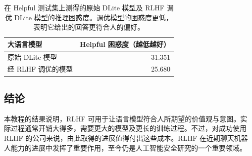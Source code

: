 \begin{table}[!htbp]
\centering
\caption{在 Helpful 测试集上测得的原始 DLite 模型及 RLHF 调优 DLite 模型的推理困惑度。调优模型的困惑度更低，表明它给出的回答更符合人的偏好。}
\label{tab:ch05-perplexity}
\begin{tabular}{@{}lr@{}}
\toprule
大语言模型 & Helpful 困惑度（越低越好）\\
\midrule
原始 DLite 模型 & 31.351\\
经 RLHF 调优的模型 & 25.680\\
\bottomrule
\end{tabular}
\end{table}

\subsection{结论}
本教程的结果说明，RLHF 可用于让语言模型符合人所期望的价值观与意图。实际过程通常开销大得多，需要更大的模型及更长的训练过程。不过，对成功使用 RLHF 的公司来说，由此取得的进展值得付出这些成本。RLHF 在近期聊天机器人能力的进展中发挥了重要作用，至今仍是人工智能安全研究的一个重要领域。
